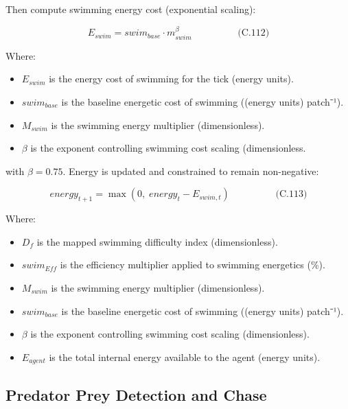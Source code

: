 \documentclass[
]{book}
\providecommand{\tightlist}{%
  \setlength{\itemsep}{0pt}\setlength{\parskip}{0pt}}
\begin{document}
Then compute swimming energy cost (exponential scaling):

\[
\begin{equation} E_{swim} = swim_{base} \cdot m_{swim}^{\beta}  \hspace{2cm} \text{(C.112)} \end{equation}
\]

Where:

\begin{itemize}
\tightlist
\item
  \(E_{swim}\) is the energy cost of swimming for the tick (energy
  units).
\item
  \(swim_{base}\) is the baseline energetic cost of swimming ((energy
  units) patch⁻¹).
\item
  \(M_{swim}\) is the swimming energy multiplier (dimensionless).
\item
  \(\beta\) is the exponent controlling swimming cost scaling
  (dimensionless.
\end{itemize}

with \(\beta = 0.75\). Energy is updated and constrained to remain
non-negative:

\[
\begin{equation} energy_{t+1} = \max(0,\; energy_t - E_{swim,t})  \hspace{2cm} \text{(C.113)} \end{equation}
\]

Where:

\begin{itemize}
\tightlist
\item
  \(D_f\) is the mapped swimming difficulty index (dimensionless).
\item
  \(swim_{Eff}\) is the efficiency multiplier applied to swimming
  energetics (\%).
\item
  \(M_{swim}\) is the swimming energy multiplier (dimensionless).
\item
  \(swim_{base}\) is the baseline energetic cost of swimming ((energy
  units) patch⁻¹).
\item
  \(\beta\) is the exponent controlling swimming cost scaling
  (dimensionless).
\item
  \(E_{agent}\) is the total internal energy available to the agent
  (energy units).
\end{itemize}

\subsection{Predator Prey Detection and Chase}\label{predator-prey-detection-and-chase}
\end{document}
